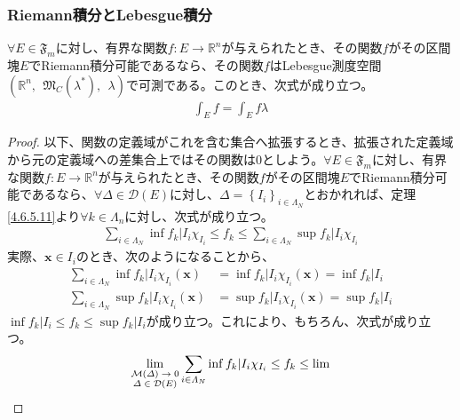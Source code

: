 \documentclass[dvipdfmx]{jsarticle}
\begin{document}
\subsubsection{Riemann積分とLebesgue積分}%
\begin{thm}\label{4.6.5.16}
$\forall E \in \mathfrak{F}_{m}$に対し、有界な関数$f:E \rightarrow \mathbb{R}^{n}$が与えられたとき、その関数$f$がその区間塊$E$でRiemann積分可能であるなら、その関数$f$はLebesgue測度空間$\left( \mathbb{R}^{n},\ \ \mathfrak{M}_{C}\left( \lambda^{*} \right),\ \ \lambda \right)$で可測である。このとき、次式が成り立つ。
\begin{align*}
\int_{E} f = \int_{E} {f\lambda}
\end{align*}
\end{thm}
\begin{proof}
以下、関数の定義域がこれを含む集合へ拡張するとき、拡張された定義域から元の定義域への差集合上ではその関数は$0$としよう。$\forall E \in \mathfrak{F}_{m}$に対し、有界な関数$f:E \rightarrow \mathbb{R}^{n}$が与えられたとき、その関数$f$がその区間塊$E$でRiemann積分可能であるなら、$\forall\varDelta \in \mathcal{D}(E)$に対し、$\varDelta = \left\{ I_{i} \right\}_{i \in \varLambda_{N}}$とおかれれば、定理\ref{4.6.5.11}より$\forall k \in \varLambda_{n}$に対し、次式が成り立つ。
\begin{align*}
\sum_{i \in \varLambda_{N}} {\inf{f_{k}|I_{i}}\chi_{I_{i}}} \leq f_{k} \leq \sum_{i \in \varLambda_{N}} {\sup{f_{k}|I_{i}}\chi_{I_{i}}}
\end{align*}
実際、$\mathbf{x} \in I_{i}$のとき、次のようになることから、
\begin{align*}
\sum_{i \in \varLambda_{N}} {\inf{f_{k}|I_{i}}\chi_{I_{i}}\left( \mathbf{x} \right)} &= \inf{f_{k}|I_{i}}\chi_{I_{i}}\left( \mathbf{x} \right) = \inf{f_{k}|I_{i}}\\
\sum_{i \in \varLambda_{N}} {\sup{f_{k}|I_{i}}\chi_{I_{i}}\left( \mathbf{x} \right)} &= \sup{f_{k}|I_{i}}\chi_{I_{i}}\left( \mathbf{x} \right) = \sup{f_{k}|I_{i}}
\end{align*}
$\inf{f_{k}|I_{i}} \leq f_{k} \leq \sup{f_{k}|I_{i}}$が成り立つ。これにより、もちろん、次式が成り立つ。
\begin{align*}
\lim_{\scriptsize \begin{matrix}
\mathcal{M}(\varDelta) \rightarrow 0 \\
\varDelta \in \mathcal{D}(E) \\
\end{matrix}}{\sum_{i \in \varLambda_{N}} {\inf{f_{k}|I_{i}}\chi_{I_{i}}}} \leq f_{k} \leq \lim_{\scriptsize \begin{matrix}

\end{matrix}}
\end{align*}
\end{proof}
\end{document}
